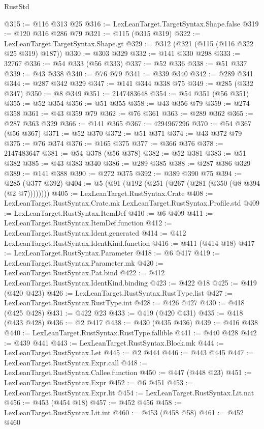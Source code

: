 \begin{lexlean}{RustStd}
\begin{coremodule}
{\begin{coremodule}
{{{{{{{{{{{@315 := @116 @313 @25
@316 := LexLeanTarget.TargetSyntax.Shape.false
@319 := @120 @316 @286 @79
@321 := @115 (@315 @319)
@322 := LexLeanTarget.TargetSyntax.Shape.gt
@329 := @312 (@321 (@115 (@116 @322 @25 @319) @187))
@330 := @303 @329
@332 := @141 @330 @298
@333 := 32767
@336 := @54 @333 (@56 @333)
@337 := @52 @336
@338 := @51 @337
@339 := @43 @338
@340 := @76 @79
@341 := @339 @340
@342 := @289 @341
@344 := @287 @342 @329
@347 := @141 @344 @338 @75
@349 := @285 (@332 @347)
@350 := @8 @349
@351 := 2147483648
@354 := @54 @351 (@56 @351)
@355 := @52 @354
@356 := @51 @355
@358 := @43 @356 @79
@359 := @274 @358
@361 := @43 @359 @79
@362 := @76 @361
@363 := @289 @362
@365 := @287 @363 @329
@366 := @141 @365
@367 := 4294967296
@370 := @54 @367 (@56 @367)
@371 := @52 @370
@372 := @51 @371
@374 := @43 @372 @79
@375 := @76 @374
@376 := @165 @375
@377 := @366 @376
@378 := 2147483647
@381 := @54 @378 (@56 @378)
@382 := @52 @381
@383 := @51 @382
@385 := @43 @383 @340
@386 := @289 @385
@388 := @287 @386 @329
@389 := @141 @388
@390 := @272 @375
@392 := @389 @390 @75
@394 := @285 (@377 @392)
@404 := @5 (@91 (@192 (@251 (@267 (@281 (@350 (@8 @394 (@2 @7))))))))
@405 := LexLeanTarget.RustSyntax.Crate
@408 := LexLeanTarget.RustSyntax.Crate.mk LexLeanTarget.RustSyntax.Profile.std
@409 := LexLeanTarget.RustSyntax.ItemDef
@410 := @6 @409
@411 := LexLeanTarget.RustSyntax.ItemDef.function
@412 := LexLeanTarget.RustSyntax.Ident.generated
@414 := @412 LexLeanTarget.RustSyntax.IdentKind.function
@416 := @411 (@414 @18)
@417 := LexLeanTarget.RustSyntax.Parameter
@418 := @6 @417
@419 := LexLeanTarget.RustSyntax.Parameter.mk
@420 := LexLeanTarget.RustSyntax.Pat.bind
@422 := @412 LexLeanTarget.RustSyntax.IdentKind.binding
@423 := @422 @18
@425 := @419 (@420 @423)
@426 := LexLeanTarget.RustSyntax.RustType.list
@427 := LexLeanTarget.RustSyntax.RustType.int
@428 := @426 @427
@430 := @418 (@425 @428)
@431 := @422 @23
@433 := @419 (@420 @431)
@435 := @418 (@433 @428)
@436 := @2 @417
@438 := @430 (@435 @436)
@439 := @416 @438
@440 := LexLeanTarget.RustSyntax.RustType.fallible
@441 := @440 @428
@442 := @439 @441
@443 := LexLeanTarget.RustSyntax.Block.mk
@444 := LexLeanTarget.RustSyntax.Let
@445 := @2 @444
@446 := @443 @445
@447 := LexLeanTarget.RustSyntax.Expr.call
@448 := LexLeanTarget.RustSyntax.Callee.function
@450 := @447 (@448 @23)
@451 := LexLeanTarget.RustSyntax.Expr
@452 := @6 @451
@453 := LexLeanTarget.RustSyntax.Expr.lit
@454 := LexLeanTarget.RustSyntax.Lit.nat
@456 := @453 (@454 @18)
@457 := @452 @456
@458 := LexLeanTarget.RustSyntax.Lit.int
@460 := @453 (@458 @58)
@461 := @452 @460
}}}}}}}}}}}
\end{coremodule}}
\end{coremodule}
\end{lexlean}
